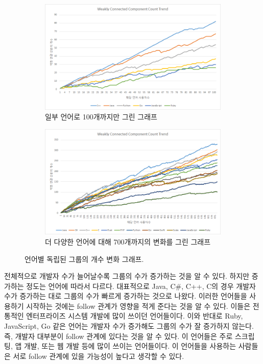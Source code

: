 \documentclass[10pt, a4paper, titlepage]{article}
\begin{document}
\begin{figure}

\begin{subfigure}{0.99\textwidth}
	\includegraphics[width=\textwidth]{image11}
	\caption{일부 언어로 100개까지만 그린 그래프}
\end{subfigure}

\begin{subfigure}{0.99\textwidth}
	\includegraphics[width=\textwidth]{image_cc}
	\caption{더 다양한 언어에 대해 700개까지의 변화를 그린 그래프}
\end{subfigure}

\caption{언어별 독립된 그룹의 개수 변화 그래프.}
\label{fig:cctrend}
\end{figure}

전체적으로 개발자 수가 늘어날수록 그룹의 수가 증가하는 것을 알 수 있다. 하지만 증가하는 정도는 언어에 따라서 다르다. 대표적으로 Java, C\#, C++, C의 경우 개발자 수가 증가하는 대로 그룹의 수가 빠르게 증가하는 것으로 나왔다. 이러한 언어들을 사용하기 시작하는 것에는 follow 관계가 영향을 적게 준다는 것을 알 수 있다. 이들은 전통적인 엔터프라이즈 시스템 개발에 많이 쓰이던 언어들이다. 이와 반대로 Ruby, JavaScript, Go 같은 언어는 개발자 수가 증가해도 그룹의 수가 잘 증가하지 않는다. 즉, 개발자 대부분이 follow 관계에 있다는 것을 알 수 있다. 이 언어들은 주로 스크립팅, 앱 개발, 또는 웹 개발 등에 많이 쓰이는 언어들이다. 이 언어들을 사용하는 사람들은 서로 follow 관계에 있을 가능성이 높다고 생각할 수 있다.
\end{document}
